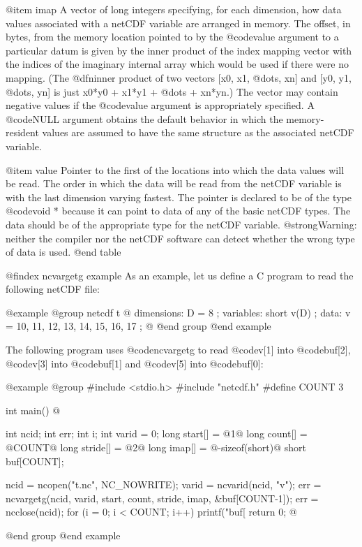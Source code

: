 @item imap
A vector of long integers specifying, for each dimension, how data
values associated with a netCDF variable are arranged in memory.  The
offset, in bytes, from the memory location pointed to by the
@code{value} argument to a particular datum is given by the inner
product of the index mapping vector with the indices of the 
imaginary internal array which would be used if there were no mapping.
(The @dfn{inner product} of two vectors [x0, x1, @dots{}, xn] and [y0,
y1, @dots{}, yn] is just x0*y0 + x1*y1 + @dots{} + xn*yn.)  The vector
may contain negative values if the @code{value} argument is
appropriately specified.  A @code{NULL} argument obtains the default
behavior in which the memory-resident values are assumed to have the
same structure as the associated netCDF variable.

@item value
Pointer to the first of the locations into which the data values will be
read.  The order in which the data will be read from the netCDF variable
is with the last dimension varying fastest.
The pointer is declared to be of the type @code{void *} because it can
point to data of any of the basic netCDF types.  The data should be of
the appropriate type for the netCDF variable.  @strong{Warning: neither
the compiler nor the netCDF software can detect whether the wrong type
of data is used.}
@end table

@findex ncvargetg example
As an example, let us define a C program to read the following netCDF file:

@example
@group
netcdf t @{
dimensions:
        D = 8 ;
variables:
        short v(D) ;
data:
 v = 10, 11, 12, 13, 14, 15, 16, 17 ;
@}
@end group
@end example

The following program uses @code{ncvargetg} to read 
@code{v[1]} into @code{buf[2]},
@code{v[3]} into @code{buf[1]} and
@code{v[5]} into @code{buf[0]}:

@example
@group
#include <stdio.h>
#include "netcdf.h"
#define COUNT 3 

int main()
@{
    int ncid;
    int err;
    int i;
    int varid = 0;
    long start[] = @{1@}
    long count[] = @{COUNT@}
    long stride[] = @{2@}
    long imap[] = @{-sizeof(short)@}
    short buf[COUNT];

    ncid = ncopen("t.nc", NC_NOWRITE);
    varid = ncvarid(ncid, "v");
    err = ncvargetg(ncid, varid, start, count, stride, imap, &buf[COUNT-1]);
    err = ncclose(ncid);
    for (i = 0; i < COUNT; i++)
        printf("buf[%
    return 0;
@}
@end group
@end example

